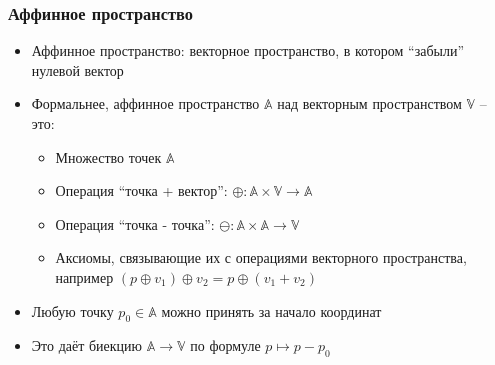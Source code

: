 \documentclass[10pt]{beamer}
\begin{document}
\begin{frame}[fragile]
\frametitle{Аффинное пространство}
\begin{itemize}
\item Аффинное пространство: векторное пространство, в котором ``забыли''  нулевой вектор
\pause
\item Формальнее, аффинное пространство \begin{math}\mathbb A\end{math} над векторным пространством \begin{math}\mathbb V\end{math} -- это:
\pause
\begin{itemize}
\item Множество точек \begin{math}\mathbb A\end{math}
\pause
\item Операция ``точка + вектор'': \begin{math}\oplus: \mathbb A \times \mathbb V \rightarrow \mathbb A\end{math}
\pause
\item Операция ``точка - точка'': \begin{math}\ominus: \mathbb A \times \mathbb A \rightarrow \mathbb V\end{math}
\pause
\item Аксиомы, связывающие их с операциями векторного пространства, например
\begin{math}(p\oplus v_1)\oplus v_2 = p\oplus(v_1+v_2)\end{math}
\end{itemize}
\pause
\item Любую точку \begin{math}p_0\in \mathbb A\end{math} можно принять за начало координат
\item Это даёт биекцию \begin{math}\mathbb A \rightarrow \mathbb V\end{math} по формуле \begin{math}p \mapsto p - p_0\end{math}
\end{itemize}
\end{frame}
\end{document}
